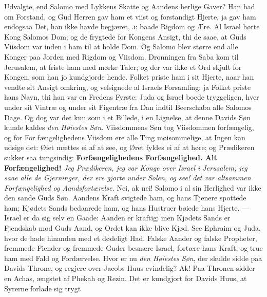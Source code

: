 \documentclass[12pt,a4paper]{book}
\begin{document}
Udvalgte, end Salomo med Lykkens Skatte og Aandens herlige Gaver? Han bad om
Forstand, og Gud Herren gav ham et viist og forstandigt Hjerte, ja gav ham
endogsaa Det, han ikke havde begjæret, ɔ: baade Rigdom og Ære. Al Israel hørte
Kong Salomos Dom; og de frygtede for Kongens Ansigt, thi de saae, at Guds
Viisdom var inden i ham til at holde Dom. Og Salomo blev større end alle Konger
paa Jorden med Rigdom og Viisdom. Dronningen fra Saba kom til Jerusalem, at
friste ham med mørke Taler; og der var ikke et Ord skjult for Kongen, som han jo
kundgjorde hende. Folket priste ham i sit Hjerte, naar han vendte sit Ansigt
omkring, og velsignede al Israels Forsamling; ja Folket priste hans Navn, thi
han var en Fredens Fyrste: Juda og Israel boede tryggeligen, hver under sit
Vintræ og under sit Figentræ fra Dan indtil Beerschaba alle Salomos Dage. Og dog
var det kun som i et Billede, i en Lignelse, at denne Davids Søn kunde kaldes
\emph{den Høiestes Søn}. Viisdommens Søn tog Viisdommen forfængelig, og for For\-%
fængelighedens Viisdom ere alle Ting møisommelige, at Ingen kan udsige det: Øiet
mættes ei af at see, og Øret fyldes ei af at høre; og Prædikeren sukker saa
tungsindig: \textbf{Forfængelighedens Forfængelighed. Alt Forfængelighed!}
\emph{Jeg Prædikeren, jeg var Konge over Israel i Jerusalem; jeg saae alle de
Gjerninger, der ere gjorte under Solen, og see! det var altsammen Forfængelighed
og Aandsfortærelse.} Nei, ak nei! Salomo i al sin Herlighed var ikke den sande
Guds Søn. Aandens Kraft svigtede ham, og hans Tjenere spottede ham; Kjødets
Sands bedaarede ham, og hans Hustruer bøiede hans Hjerte. --- Israel er da sig
selv en Gaade: Aanden er kraftig; men Kjødets Sands er Fjendskab mod Guds Aand,
og Ordet kan ikke blive Kjød. See Ephraim og Juda, hvor de hade hinanden med et
dødeligt Had. Falske Aander og falske Propheter, fremmede Fiender og fremmede
Guder besnære Israel, fortære hans Kraft, og true ham med Fald og Fordærvelse.
Hvor er nu \emph{den Høiestes Søn}, der skulde sidde paa Davids Throne, og
regjere over Jacobs Huus evindelig? Ak! Paa Thronen sidder en Achas, ængstet af
Phekah og Rezin. Det er kundgjort for Davids Huus, at Syrerne forlade sig trygt
\end{document}
